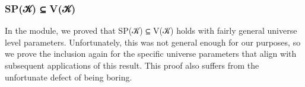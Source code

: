 \subsubsection{SP(𝒦) ⊆ V(𝒦)}\label{sssec:sp-in-v}
In the \ualibVarieties module, we proved that \ad S\ad P(\ab 𝒦) \af ⊆ \ad V(\ab 𝒦) holds with fairly general universe level parameters. Unfortunately, this was not general enough for our purposes, so we prove the inclusion again for the specific universe parameters that align with subsequent applications of this result. This proof also
suffers from the unfortunate defect of being boring.
\ccpad
\begin{code}%
\>[1]\AgdaSpace{}%
\AgdaSymbol{:}\AgdaSpace{}%
\AgdaSymbol{\{}\AgdaSymbol{\}\{}\AgdaSymbol{\}}\AgdaSpace{}%
\AgdaSymbol{(}\AgdaSymbol{\{}\AgdaSymbol{\}\{}\AgdaSymbol{\}}\AgdaSpace{}%
\AgdaSymbol{)}\AgdaSpace{}%
\AgdaSpace{}%
\AgdaSymbol{\{}\AgdaSymbol{\}\{}\AgdaSymbol{\}}\AgdaSpace{}%
\<%
\\
%
\\[\AgdaEmptyExtraSkip]%
%
\>[1]\AgdaSpace{}%
\AgdaSymbol{(}\AgdaSymbol{\{}\AgdaSymbol{\}}\AgdaSpace{}%
\AgdaSymbol{)}\AgdaSpace{}%
\AgdaSymbol{=}\AgdaSpace{}%
\<%
\\
\>[1][@{}l@{\AgdaIndent{0}}]%
\>[2]\<%
\\
\>[2][@{}l@{\AgdaIndent{0}}]%
\>[3]\AgdaSpace{}%
\AgdaSpace{}%
\AgdaSymbol{:}\AgdaSpace{}%
\AgdaSpace{}%
\AgdaSpace{}%
\<%
\\
%
\>[3]\AgdaSpace{}%
\AgdaSymbol{=}\AgdaSpace{}%
\AgdaSpace{}%
\AgdaSpace{}%
\<%
\\
%
\>[3]\AgdaSpace{}%
\AgdaSymbol{=}\AgdaSpace{}%
\AgdaSpace{}%
\AgdaSymbol{(}\AgdaSpace{}%
\AgdaSpace{}%
\AgdaSymbol{)}\AgdaSpace{}%
\<%
\\
%
\\[\AgdaEmptyExtraSkip]%
%
\>[3]\AgdaSpace{}%
\AgdaSymbol{:}\AgdaSpace{}%
\AgdaSpace{}%
\AgdaSpace{}%

\end{code}
